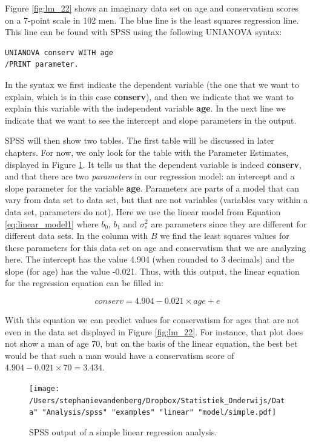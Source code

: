 \documentclass[]{book}\usepackage[]{graphicx}\usepackage[]{color}
\begin{document}
Figure \ref{fig:lm_22} shows an imaginary data set on age and conservatism scores on a 7-point scale in 102 men. The blue line is the least squares regression line. This line can be found with SPSS using the following UNIANOVA syntax:

\begin{verbatim}
UNIANOVA conserv WITH age
/PRINT parameter.
\end{verbatim}

In the syntax we first indicate the dependent variable (the one that we want to explain, which is in this case \textbf{conserv}), and then we indicate that we want to explain this variable with the independent variable \textbf{age}. In the next line we indicate that we want to see the intercept and slope parameters in the output.

SPSS will then show two tables. The first table will be discussed in later chapters. For now, we only look for the table with the Parameter Estimates, displayed in Figure \ref{fig:simple}. It tells us that the dependent variable is indeed \textbf{conserv}, and that there are two \textit{parameters} in our regression model: an intercept and a slope parameter for the variable \textbf{age}. Parameters are parts of a model that can vary from data set to data set, but that are not variables (variables vary within a data set, parameters do not). Here we use the linear model from Equation \ref{eq:linear_model1} where $b_0$, $b_1$ and $\sigma_e^2$ are parameters since they are different for different data sets. In the column with $B$ we find the least squares values for these parameters for this data set on age and conservatism that we are analyzing here. The intercept has the value 4.904 (when rounded to 3 decimals) and the slope (for age) has the value -0.021. Thus, with this output, the linear equation for the regression equation can be filled in:

\begin{equation}
conserv = 4.904 -0.021 \times age + e
\end{equation}

With this equation we can predict values for conservatism for ages that are not even in the data set displayed in Figure \ref{fig:lm_22}. For instance, that plot does not show a man of age 70, but on the basis of the linear equation, the best bet would be that such a man would have a conservatism score of $4.904 -0.021 \times 70= 3.434$.


\begin{figure}[h]
    \begin{center}
       \texttt{[image: /Users/stephanievandenberg/Dropbox/Statistiek\_Onderwijs/Data" "Analysis/spss" "examples"  "linear" "model/simple.pdf]}
    \end{center}
    \caption{SPSS output of a simple linear regression analysis.}
    \label{fig:simple}
\end{figure}
\end{document}
